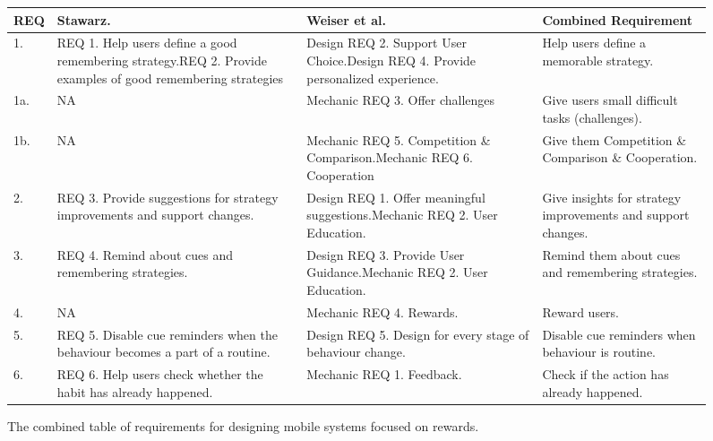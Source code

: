 \begin{landscape}
\renewcommand{\arraystretch}{1.5} %
\begin{figure}[ht] %


\begin{center}
\begin{tabular}{ |p{.9cm}|p{6.5cm}|p{6.5cm}|p{5.8cm}| }
  \hline
  \textbf{REQ} & \textbf{Stawarz.~\cite{thesis_kathy}} & \textbf{Weiser et al.~\cite{article_taxonomy_motivational_affordances_meaningful}} & \textbf{Combined Requirement} \\ \hline %
  1.  & REQ 1. Help users define a good remembering strategy.\newline REQ 2. Provide examples of good remembering strategies & Design REQ 2. Support User Choice.\newline Design REQ 4. Provide personalized experience. & Help users define a memorable strategy. \\ \hline
  1a. & N\/A & Mechanic REQ 3. Offer challenges & Give users small difficult tasks (challenges). \\ \hline
  1b. & N\/A & Mechanic REQ 5. Competition \& Comparison.\newline Mechanic REQ 6. Cooperation & Give them Competition \& Comparison \& Cooperation. \\ \hline
  2.  & REQ 3. Provide suggestions for strategy improvements and support changes. & Design REQ 1. Offer meaningful suggestions.\newline Mechanic REQ 2. User Education. & Give insights for strategy improvements and support changes. \\ \hline
  3.  & REQ 4. Remind about cues and remembering strategies. & Design REQ 3. Provide User Guidance.\newline Mechanic REQ 2. User Education. & Remind them about cues and remembering strategies. \\ \hline
  4.  & N\/A & Mechanic REQ 4. Rewards. & Reward users. \\ \hline
  5.  & REQ 5. Disable cue reminders when the behaviour becomes a part of a routine. & Design REQ 5. Design for every stage of behaviour change. & Disable cue reminders when behaviour is routine. \\ \hline
  6.  & REQ 6. Help users check whether the habit has already happened. & Mechanic REQ 1. Feedback. & Check if the action has already happened. \\ \hline
\end{tabular}
\end{center}

    \caption{The combined table of requirements for designing mobile systems focused on rewards.}
    \label{fig:reqtable}
\end{figure}
\newpage
\end{landscape}


